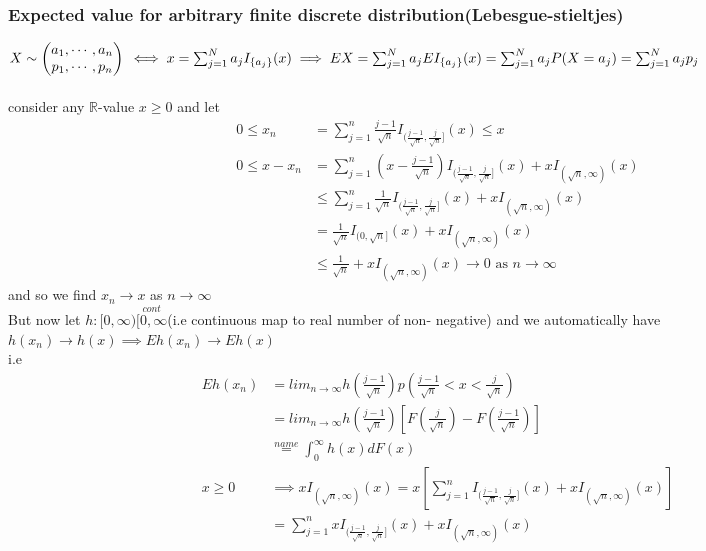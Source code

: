 \documentclass{article}
\theoremstyle{definition}
\theoremstyle{thrm}
\theoremstyle{lma}
\theoremstyle{ppst}
\theoremstyle{crlr}
\begin{document}
\subsubsection{Expected value for arbitrary finite discrete distribution(Lebesgue-stieltjes)}
$X\sim 
\begin{pmatrix}
	a_1, \cdots, a_n\\
	p_1, \cdots, p_n
\end{pmatrix}\\ \iff x = \sum_{j=1}^N a_jI_{\{a_j\}}(x) \implies EX = \sum_{j=1}^N a_jEI_{\{a_j\}}(x) = \sum_{j=1}^N a_jP(X=a_j) = \sum_{j=1}^Na_jp_j$\\
\\
consider any $\mathbb{R}$-value $x\geq 0$ and let
\begin{align*}
	0\leq x_n &= \sum_{j=1}^n\frac{j-1}{\sqrt{n}}I_{(\frac{j-1}{\sqrt{n}},\frac{j}{\sqrt{n}}]}(x)\leq x\\
	0\leq x-x_n &=\sum_{j=1}^n(x-\frac{j-1}{\sqrt{n}})I_{(\frac{j-1}{\sqrt{n}},\frac{j}{\sqrt{n}}]}(x)+xI_{(\sqrt{n},\infty)}(x)\\
	&\leq \sum_{j=1}^n\frac{1}{\sqrt{n}}I_{(\frac{j-1}{\sqrt{n}},\frac{j}{\sqrt{n}}]}(x)+xI_{(\sqrt{n},\infty)}(x)\\
	&= \frac{1}{\sqrt{n}}I_{(0,\sqrt{n}]}(x)+xI_{(\sqrt{n},\infty)}(x)\\
	&\leq \frac{1}{\sqrt{n}}+xI_{(\sqrt{n},\infty)}(x)\to 0 \text{ as } n\to \infty
\end{align*}
and so we find $x_n\to x $ as $n \to \infty$\\
But now let $h:[0,\infty)\stackrel{cont}{[0,\infty}$(i.e continuous map to real number of non- negative) and we automatically have $h(x_n)\to h(x) \implies Eh(x_n) \to Eh(x)$\\
i.e 
\begin{align*}
	Eh(x_n) &= lim_{n\to \infty}h(\frac{j-1}{\sqrt{n}})p(\frac{j-1}{\sqrt{n}}<x<\frac{j}{\sqrt{n}})\\
	&=lim_{n\to \infty}h(\frac{j-1}{\sqrt{n}})[F(\frac{j}{\sqrt{n}})-F(\frac{j-1}{\sqrt{n}})]\\
	&\stackrel{name}{=}\int_0^\infty h(x)dF(x)\\
	x\geq 0 &\implies xI_{(\sqrt{n},\infty)}(x) = x[\sum_{j=1}^nI_{(\frac{j-1}{\sqrt{n}},\frac{j}{\sqrt{n}}]}(x)+xI_{(\sqrt{n},\infty)}(x)]\\
	&=\sum_{j=1}^nxI_{(\frac{j-1}{\sqrt{n}},\frac{j}{\sqrt{n}}]}(x)+xI_{(\sqrt{n},\infty)}(x)
\end{align*}
\end{document}
